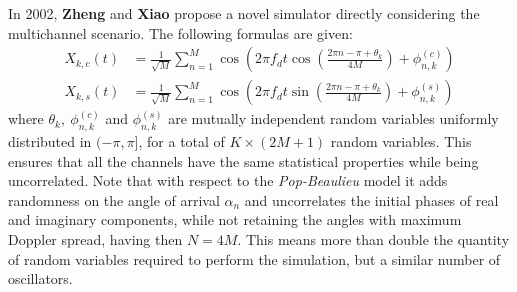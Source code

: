 In 2002, \textbf{Zheng} and \textbf{Xiao} \cite{C2} propose a novel simulator directly considering the multichannel scenario. The following formulas are given:%
%
\begin{subequations}
\begin{align}
X_{k,c}(t) &= \frac{1}{\sqrt{M}} \sum_{n=1}^{M} \cos \left( 2\pi f_d t \cos \left( \frac{2\pi n - \pi + \theta_k}{4M}\right) + \phi_{n,k}^{(c)} \right)\\
X_{k,s}(t) &= \frac{1}{\sqrt{M}} \sum_{n=1}^{M} \cos \left( 2\pi f_d t \sin \left( \frac{2\pi n - \pi + \theta_k}{4M}\right) + \phi_{n,k}^{(s)} \right)
\end{align}
\end{subequations}%
%
where $\theta_k, \ \phi_{n,k}^{(c)}$ and $\phi_{n,k}^{(s)}$ are mutually independent random variables uniformly distributed in $(-\pi,\pi]$, for a total of $K \times (2M+1)$ random variables. This ensures that all the channels have the same statistical properties while being uncorrelated. Note that with respect to the \textit{Pop-Beaulieu} model it adds randomness on the angle of arrival $\alpha_n$ and uncorrelates the initial phases of real and imaginary components, while not retaining the angles with maximum Doppler spread, having then $N=4M$. This means more than double the quantity of random variables required to perform the simulation, but a similar number of oscillators.

